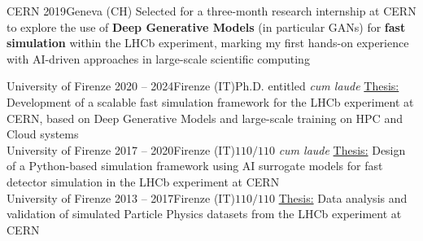 \documentclass[
  a4paper, 
]{fortysecondscv}
\begin{document}
\begin{cvtable}[2]
      {CERN}
      {2019}{Geneva (CH)}
      {Selected for a three-month research internship at CERN to explore the use of \textbf{Deep Generative Models} (in particular GANs) for \textbf{fast simulation} within the LHCb experiment, marking my first hands-on experience with AI-driven approaches in large-scale scientific computing}
\end{cvtable}

\newpage
\makebacksidebar

\vspace{-0.5em}

\begin{cvtable}[2]
      {University of Firenze}
      {2020 -- 2024}{Firenze (IT)}{Ph.D. entitled \emph{cum laude}}
      {\ul{Thesis:} Development of a scalable fast simulation framework for the LHCb experiment at CERN, based on Deep Generative Models and large-scale training on HPC and Cloud systems}
    \vspace{-1em}
    \raisebox{0.8em}{%
        \hdashrule{\linewidth}{0.1pt}{2pt 2pt}%
    }\\ [-1em]
      {University of Firenze}
      {2017 -- 2020}{Firenze (IT)}{$110/110$ \emph{cum laude}}
      {\ul{Thesis:} Design of a Python-based simulation framework using AI surrogate models for fast detector simulation in the LHCb experiment at CERN}
    \vspace{-1em}
    \raisebox{0.8em}{%
        \hdashrule{\linewidth}{0.1pt}{2pt 2pt}%
    }\\ [-1em]
      {University of Firenze}
      {2013 -- 2017}{Firenze (IT)}{$110/110$}
      {\ul{Thesis:} Data analysis and validation of simulated Particle Physics datasets from the LHCb experiment at CERN}
\end{cvtable}
\end{document}
